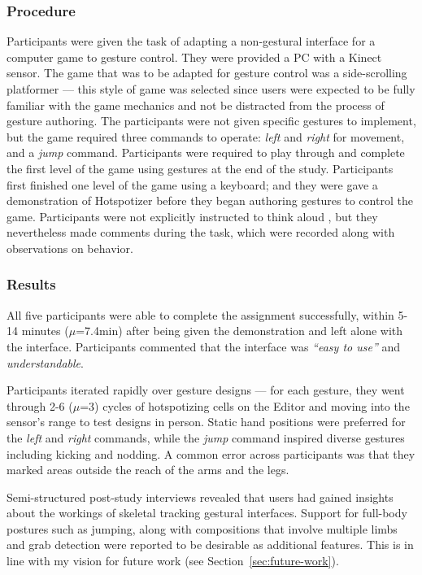 \subsubsection{Procedure}

Participants were given the task of adapting a non-gestural interface for a computer game to gesture control. They were provided a PC with a Kinect sensor. The game that was to be adapted for gesture control was a side-scrolling platformer --- this style of game was selected since users were expected to be fully familiar with the game mechanics and not be distracted from the process of gesture authoring. The participants were not given specific gestures to implement, but the game required three commands to operate: \emph{left} and \emph{right} for movement, and a \emph{jump} command. Participants were required to play through and complete the first level of the game using gestures at the end of the study. Participants first finished one level of the game using a keyboard; and they were gave a demonstration of Hotspotizer before they began authoring gestures to control the game. Participants were not explicitly instructed to think aloud \parencite{Nielsen:1993:engineering, Holzinger:2005, Boren:2000, Jaspers:2004}, but they nevertheless made comments during the task, which were recorded along with observations on behavior.

\subsubsection{Results}

All five participants were able to complete the assignment successfully, within 5-14 minutes ($\mu$=7.4min) after being given the demonstration and left alone with the interface. Participants commented that the interface was \emph{“easy to use”} and \emph{understandable}.

Participants iterated rapidly over gesture designs --- for each gesture, they went through 2-6 ($\mu$=3) cycles of hotspotizing cells on the Editor and moving into the sensor’s range to test designs in person. Static hand positions were preferred for the \emph{left} and \emph{right} commands, while the \emph{jump} command inspired diverse gestures including kicking and nodding. A common error across participants was that they marked areas outside the reach of the arms and the legs.

Semi-structured post-study interviews revealed that users had gained insights about the workings of skeletal tracking gestural interfaces. Support for full-body postures such as jumping, along with compositions that involve multiple limbs and grab detection were reported to be desirable as additional features. This is in line with my vision for future work (see Section~\ref{sec:future-work}).

